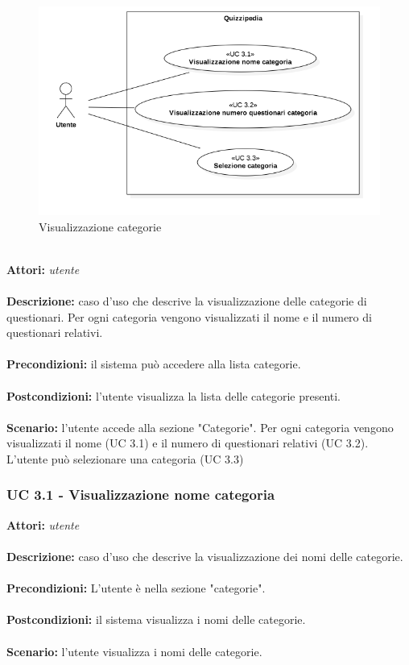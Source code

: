 \documentclass[a4paper,11pt]{article}
\begin{document}
\begin{figure}[h!]
\centering
\includegraphics[scale=0.6]{../immagini/UC3.png}
\caption{Visualizzazione categorie}
\end{figure}
\ \\
\textbf{Attori:} \textit{utente}
\\ \\
\textbf{Descrizione:} caso d'uso che descrive la visualizzazione delle categorie di questionari. Per ogni categoria vengono visualizzati il nome e il numero di questionari relativi.\\
\\
\textbf{Precondizioni:} il sistema può accedere alla lista categorie.\\
\\
\textbf{Postcondizioni:} l’utente visualizza la lista delle categorie presenti.\\
\\
\textbf{Scenario:} l’utente accede alla sezione "Categorie". Per ogni categoria vengono visualizzati il nome (UC 3.1) e il numero di questionari relativi (UC 3.2). L'utente può selezionare una categoria (UC 3.3)\\


\subsubsection{UC 3.1 - Visualizzazione nome categoria}

\textbf{Attori:} \textit{utente}
\\ \\
\textbf{Descrizione:} caso d'uso che descrive la visualizzazione dei nomi delle categorie.\\
\\
\textbf{Precondizioni:} L'utente è nella sezione "categorie".\\
\\
\textbf{Postcondizioni:} il sistema visualizza i nomi delle categorie.\\
\\
\textbf{Scenario:} l’utente visualizza i nomi delle categorie.\\
\end{document}
